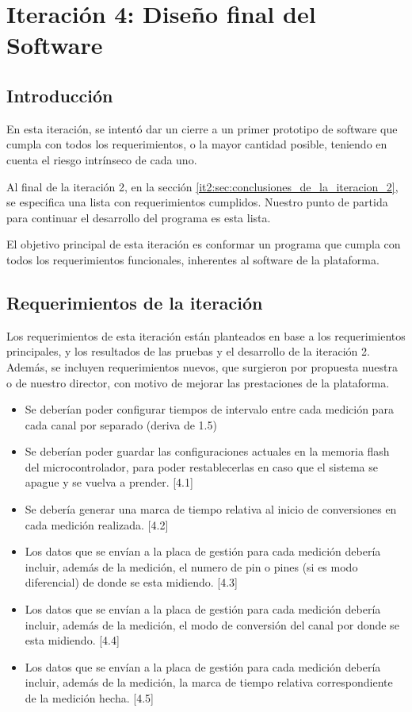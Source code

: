 \chapter{Iteración 4: Diseño final del Software} %
\label{cha:iteracion_4}

\section{Introducción} %
\label{it5:sec:introduccion}

En esta iteración, se intentó dar un cierre a un primer prototipo de software que cumpla con todos los requerimientos, o la mayor cantidad posible, teniendo en cuenta el riesgo intrínseco de cada uno.

Al final de la iteración 2, en la sección \ref{it2:sec:conclusiones_de_la_iteracion_2}, se especifica una lista con requerimientos cumplidos. Nuestro punto de partida para continuar el desarrollo del programa es esta lista. 

El objetivo principal de esta iteración es conformar un programa que cumpla con todos los requerimientos funcionales, inherentes al software de la plataforma.


\section{Requerimientos de la iteración} %
\label{it5:sec:requerimientos_de_la_iteracion}

Los requerimientos de esta iteración están planteados en base a los requerimientos principales, y los resultados de las pruebas y el desarrollo de la iteración 2. Además, se incluyen requerimientos nuevos, que surgieron por propuesta nuestra o de nuestro director, con motivo de mejorar las prestaciones de la plataforma.

\begin{itemize}
\item Se deberían poder configurar tiempos de intervalo entre cada medición para cada canal por separado (deriva de 1.5)
\item Se deberían poder guardar las configuraciones actuales en la memoria flash del microcontrolador, para poder restablecerlas en caso que el sistema se apague y se vuelva a prender. [4.1]
\item Se debería generar una marca de tiempo relativa al inicio de conversiones en cada medición realizada. [4.2]
\item Los datos que se envían a la placa de gestión para cada medición debería incluir, además de la medición, el numero de pin o pines (si es modo diferencial) de donde se esta midiendo. [4.3]
\item Los datos que se envían a la placa de gestión para cada medición debería incluir, además de la medición, el modo de conversión del canal por donde se esta midiendo. [4.4]
\item Los datos que se envían a la placa de gestión para cada medición debería incluir, además de la medición, la marca de tiempo relativa correspondiente de la medición hecha. [4.5] 
\end{itemize}


